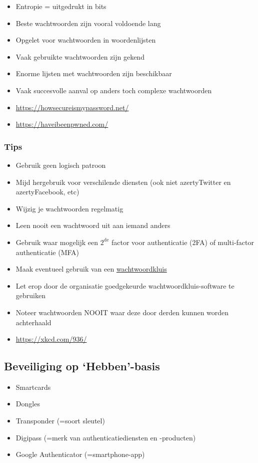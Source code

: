 \documentclass{article}
\begin{document}
\begin{itemize}
    \item Entropie = uitgedrukt in bits
    \item Beste wachtwoorden zijn vooral voldoende lang
    \item Opgelet voor wachtwoorden in woordenlijsten
    \item Vaak gebruikte wachtwoorden zijn gekend
    \item Enorme lijsten met wachtwoorden zijn beschikbaar
    \item Vaak succesvolle aanval op anders toch complexe wachtwoorden
    \item \url{https://howsecureismypassword.net/}
    \item \url{https://haveibeenpwned.com/}
\end{itemize}

\subsubsection{Tips}

\begin{itemize}
    \item Gebruik geen logisch patroon
    \item Mijd hergebruik voor verschilende diensten (ook niet azertyTwitter en azertyFacebook, etc)
    \item Wijzig je wachtwoorden regelmatig
    \item Leen nooit een wachtwoord uit aan iemand anders
    \item Gebruik waar mogelijk een $\text{2}^{\text{de}}$ factor voor authenticatie (2FA) of multi-factor authenticatie (MFA)
    \item Maak eventueel gebruik van een \underline{wachtwoordkluis}
    \item Let erop door de organisatie goedgekeurde wachtwoordkluis-software te gebruiken
    \item Noteer wachtwoorden NOOIT waar deze door derden kunnen worden achterhaald
    \item \url{https://xkcd.com/936/}
\end{itemize}

\subsection{Beveiliging op `Hebben'-basis}

\begin{itemize}
    \item Smartcards
    \item Dongles
    \item Transponder (=soort sleutel)
    \item Digipass (=merk van authenticatiediensten en -producten)
    \item Google Authenticator (=smartphone-app)
\end{itemize}
\end{document}
